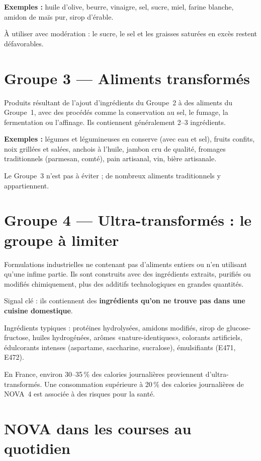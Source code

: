 \documentclass[a5paper,12pt,oneside,openany]{book}
\newcommand{\boxrouge}[2]{%
  \begin{tcolorbox}[boitebase,
    colback=rouge!8!white, colframe=rouge, title={#1}]
  #2\end{tcolorbox}}
\begin{document}
\textbf{Exemples :} huile d'olive, beurre, vinaigre, sel, sucre, miel, farine
blanche, amidon de maïs pur, sirop d'érable.

À utiliser avec modération : le sucre, le sel et les graisses saturées en
excès restent défavorables.

\section{Groupe 3 --- Aliments transformés}

Produits résultant de l'ajout d'ingrédients du Groupe~2 à des aliments du
Groupe~1, avec des procédés comme la conservation au sel, le fumage, la
fermentation ou l'affinage. Ils contiennent généralement 2--3 ingrédients.

\textbf{Exemples :} légumes et légumineuses en conserve (avec eau et sel),
fruits confits, noix grillées et salées, anchois à l'huile, jambon cru de
qualité, fromages traditionnels (parmesan, comté), pain artisanal, vin, bière
artisanale.

Le Groupe~3 n'est pas à éviter ; de nombreux aliments traditionnels
y appartiennent.

\section{Groupe 4 --- Ultra-transformés : le groupe à limiter}

Formulations industrielles ne contenant pas d'aliments entiers ou n'en utilisant
qu'une infime partie. Ils sont construits avec des ingrédients extraits, purifiés
ou modifiés chimiquement, plus des additifs technologiques en grandes quantités.

Signal clé : ils contiennent des \textbf{ingrédients qu'on ne trouve pas dans
une cuisine domestique}.

Ingrédients typiques : protéines hydrolysées, amidons modifiés, sirop de
glucose-fructose, huiles hydrogénées, arômes «nature-identiques», colorants
artificiels, édulcorants intenses (aspartame, saccharine, sucralose),
émulsifiants (E471, E472).

\boxrouge{Données clés}{En France, environ 30--35\,\% des calories journalières
proviennent d'ultra-transformés. Une consommation supérieure à 20\,\% des
calories journalières de NOVA~4 est associée à des risques pour la santé.}

\section{NOVA dans les courses au quotidien}
\end{document}

